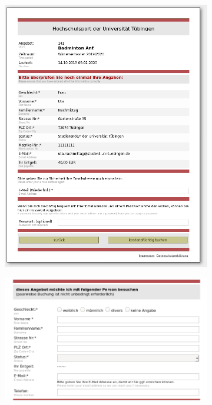 \documentclass{beamer}
\begin{document}
\begin{frame}
\begin{figure}
\begin{subfigure}{0.32\textwidth}
			\includegraphics[width=\textwidth]{figures/screenshot_bestaetigung.png}	
		\end{subfigure}	
		\begin{subfigure}{0.32\textwidth}
			\includegraphics[width=\textwidth]{figures/screenshot_issue3.png}	
		\end{subfigure}	
	\end{figure}
	\end{frame}
	
\end{document}

